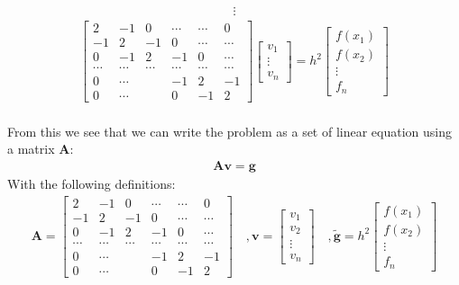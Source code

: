 \documentclass[american,a4paper,12pt]{article}
\renewcommand{\vec}[1]{\mathbf{#1}} %
\begin{document}
    \begin{align*}
      \vdots
    \end{align*}
    \begin{align*}
          \begin{bmatrix}
            2 & -1 & 0 & \cdots & \cdots & 0 \\
            -1 & 2 & -1 & 0 & \cdots & \cdots \\
            0 & -1 & 2 & -1 & 0 & \cdots \\
            \cdots & \cdots & \cdots & \cdots & \cdots & \cdots \\
            0 & \cdots & & -1 & 2 & -1 \\
            0 & \cdots & & 0 & -1 & 2
          \end{bmatrix}
          \begin{bmatrix}
            v_1 \\
            \vdots \\
            v_n
          \end{bmatrix}
    = h^2
          \begin{bmatrix}
            f(x_1) \\
            f(x_2) \\
            \vdots \\
            f_n
          \end{bmatrix}
    \end{align*}
    \\ From this we see that we can write the problem as a set of linear equation using a matrix $\vec{A}$:
    \begin{align*}
      \vec{A}\vec{v} = \vec{g}
    \end{align*}
    With the following definitions:\\
    \begin{align*}
      \vec{A} =
      \begin{bmatrix}
        2 & -1 & 0 & \cdots & \cdots & 0 \\
        -1 & 2 & -1 & 0 & \cdots & \cdots \\
        0 & -1 & 2 & -1 & 0 & \cdots \\
        \cdots & \cdots & \cdots & \cdots & \cdots & \cdots \\
        0 & \cdots & & -1 & 2 & -1 \\
        0 & \cdots & & 0 & -1 & 2
      \end{bmatrix}
      \quad, \vec{v} =
      \begin{bmatrix}
        v_1 \\
        v_2 \\
        \vdots \\
        v_n
      \end{bmatrix}
      \quad, \vec{\tilde{g}} = h^2
      \begin{bmatrix}
        f(x_1) \\
        f(x_2) \\
        \vdots \\
        f_n
      \end{bmatrix}
    \end{align*}
\end{document}
